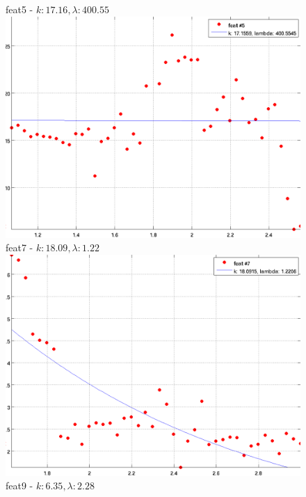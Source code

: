 \documentclass[12pt]{report}
\begin{document}
\begin{figure}[H]
\begin{minipage}[t]{0.5\linewidth}
	\centering
	feat5 - $k: 17.16, \lambda: 400.55 $\\
	\includegraphics[scale=\imFeat]{images/feat5}\\
	feat7 - $k: 18.09, \lambda: 1.22 $\\
	\includegraphics[scale=\imFeat]{images/feat7}\\
	feat9 - $k: 6.35, \lambda: 2.28 $\\

\end{minipage}
\end{figure}
\end{document}
